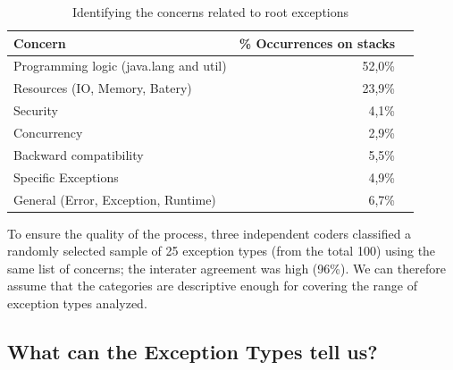 \documentclass[conference]{IEEEtran}
\begin{document}
\begin{table}
\centering
\begin{tabular}{lrr}
\hline
\bfseries{Concern} & \bfseries{\% Occurrences on stacks} \\
\hline
Programming logic (java.lang and util) & 52,0\%\\
Resources (IO, Memory, Batery) & 23,9\% \\
Security & 4,1\%\\
Concurrency & 2,9\% \\
Backward compatibility & 5,5\% \\
Specific Exceptions & 4,9\%\\
General (Error, Exception, Runtime) & 6,7\%\\
\hline
\end{tabular}
\caption{Identifying the concerns related to root exceptions}
\label{tab:tophundrend}
\end{table}

To ensure the quality of the process, three independent coders classified a randomly selected
sample of 25 exception types (from the total 100) using the same list of concerns;
the interater agreement was high (96\%).
We can therefore assume that the categories are descriptive
enough for covering the range of exception types analyzed.




\noindent {}

\subsection{What can the Exception Types tell us?}
\end{document}
